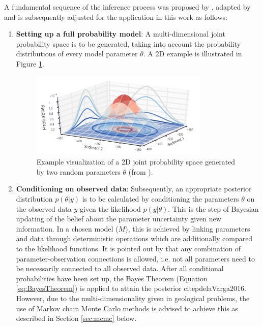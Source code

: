         A fundamental sequence of the inference process was proposed by \citet{gelman2014bayesian}, adapted by \citet{delaVarga2016} and is subsequently adjusted for the application in this work as follows:
        \begin{enumerate}
        	\item \textbf{Setting up a full probability model}: A multi-dimensional joint probability space is to be generated, taking into account the probability distributions of every model parameter $\theta$. A 2D example is illustrated in Figure \ref{fig:joint_prob}.
	        \begin{figure}[h]
				\centering
				\includegraphics[width=0.8\textwidth]{Figures/joint_prob}
				\caption{Example visualization of a 2D joint probability space generated by two random parameters $\theta$ (from \citet{delaVarga2016}).}\label{fig:joint_prob} 
			\end{figure}
        	\item \textbf{Conditioning on observed data}: Subsequently, an appropriate posterior distribution $p(\theta|y)$ is to be calculated by conditioning the parameters $\theta$ on the observed data $y$ given the likelihood $p(y|\theta)$. This is the step of Bayesian updating of the belief about the parameter uncertainty given new information.
        	In a chosen model ($M$), this is achieved by linking parameters and data through deterministic operations which are additionally compared to the likelihood functions. It is pointed out by \citet{delaVarga2016} that any combination of parameter-observation connections is allowed, i.e. not all parameters need to be necessarily connected to all observed data. After all conditional probabilities have been set up, the Bayes Theorem (Equation \ref{eq:BayesTheorem}) is applied to attain the posterior citep{delaVarga2016}. However, due to the multi-dimensionality given in geological problems, the use of Markov chain Monte Carlo methods is advised to achieve this as described in Section \ref{sec:mcmc} below.

\end{enumerate}
